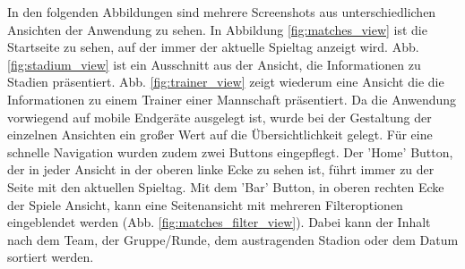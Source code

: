 \documentclass[runningheads,a4paper]{llncs}
\begin{document}
\newpage
In den folgenden Abbildungen sind mehrere Screenshots aus unterschiedlichen Ansichten der Anwendung zu sehen. In Abbildung \ref{fig:matches_view} ist die Startseite zu sehen, auf der immer der aktuelle Spieltag anzeigt wird. Abb. \ref{fig:stadium_view} ist ein Ausschnitt aus der Ansicht, die Informationen zu Stadien präsentiert. Abb. \ref{fig:trainer_view} zeigt wiederum eine Ansicht die die Informationen zu einem Trainer einer Mannschaft präsentiert. Da die Anwendung vorwiegend auf mobile Endgeräte ausgelegt ist, wurde bei der Gestaltung der einzelnen Ansichten ein großer Wert auf die Übersichtlichkeit gelegt. Für eine schnelle Navigation wurden zudem zwei Buttons eingepflegt. Der 'Home' Button, der in jeder Ansicht in der oberen linke Ecke zu sehen ist, führt immer zu der Seite mit den aktuellen Spieltag. Mit dem 'Bar' Button, in oberen rechten Ecke der Spiele Ansicht, kann eine Seitenansicht mit mehreren Filteroptionen eingeblendet werden (Abb. \ref{fig:matches_filter_view}). Dabei kann der Inhalt nach dem Team, der Gruppe/Runde, dem austragenden Stadion oder dem Datum sortiert werden.
\end{document}
